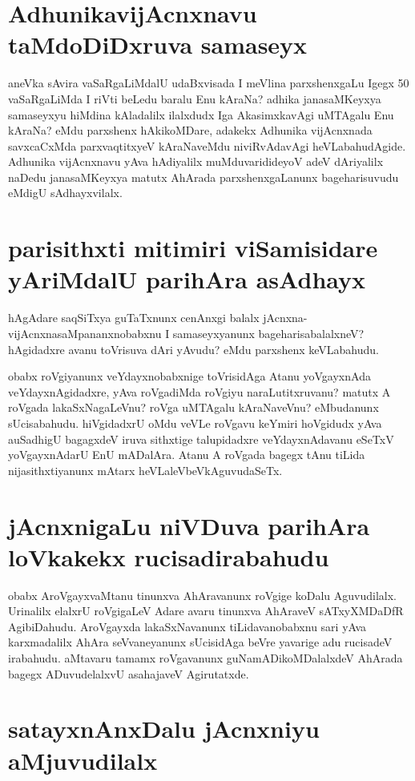 \section*{AdhunikavijAcnxnavu taMdoDiDxruva samaseyx}

aneVka sAvira vaSaRgaLiMdalU udaBxvisada I meVlina parxshenxgaLu Igegx 50 vaSaRgaLiMda I riVti beLedu baralu Enu kAraNa? adhika janasaMKeyxya samaseyxyu hiMdina kAladalilx ilalxdudx Iga AkasimxkavAgi uMTAgalu Enu kAraNa? eMdu parxshenx hAkikoMDare, adakekx Adhunika vijAcnxnada savxcaCxMda parxvaqtitxyeV kAraNaveMdu niviRvAdavAgi heVLabahudAgide. Adhunika vijAcnxnavu yAva hAdiyalilx muMduvaridideyoV adeV dAriyalilx naDedu janasaMKeyxya matutx AhArada parxshenxgaLanunx bageharisuvudu eMdigU sAdhayxvilalx. 

\section*{parisithxti mitimiri viSamisidare yAriMdalU parihAra asAdhayx}

hAgAdare saqSiTxya guTaTxnunx cenAnxgi balalx jAcnxna-vijAcnxnasaMpananxnobabxnu I samaseyxyanunx bageharisabalalxneV? hAgidadxre avanu toVrisuva dAri yAvudu? eMdu parxshenx keVLabahudu.

obabx roVgiyanunx veYdayxnobabxnige toVrisidAga Atanu yoVgayxnAda veYdayxnAgidadxre, yAva roVgadiMda roVgiyu naraLutitxruvanu? matutx A roVgada lakaSxNagaLeVnu? roVga uMTAgalu kAraNaveVnu? eMbudanunx sUcisabahudu. hiVgidadxrU oMdu veVLe roVgavu keYmiri hoVgidudx yAva auSadhigU bagagxdeV iruva sithxtige talupidadxre veYdayxnAdavanu eSeTxV yoVgayxnAdarU EnU mADalAra. Atanu A roVgada bagegx tAnu tiLida nijasithxtiyanunx mAtarx heVLaleVbeVkAguvudaSeTx.

\section*{jAcnxnigaLu niVDuva parihAra loVkakekx rucisadirabahudu}

obabx AroVgayxvaMtanu tinunxva AhAravanunx roVgige koDalu Aguvudilalx. Urinalilx elalxrU roVgigaLeV Adare avaru tinunxva AhAraveV sATxyXMDaDfR AgibiDahudu. AroVgayxda lakaSxNavanunx tiLidavanobabxnu sari yAva karxmadalilx AhAra seVvaneyanunx sUcisidAga beVre yavarige adu rucisadeV irabahudu. aMtavaru tamamx roVgavanunx guNamADikoMDalalxdeV AhArada bagegx ADuvudelalxvU asahajaveV Agirutatxde.

\section*{satayxnAnxDalu jAcnxniyu aMjuvudilalx}

